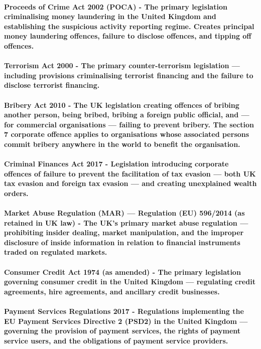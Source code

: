 \paragraph{\textbf{Proceeds of Crime Act 2002 (POCA)} - The primary legislation criminalising money laundering in the United Kingdom and establishing the suspicious activity reporting regime. Creates principal money laundering offences, failure to disclose offences, and tipping off offences.}
\paragraph{\textbf{Terrorism Act 2000} - The primary counter-terrorism legislation — including provisions criminalising terrorist financing and the failure to disclose terrorist financing.}
\paragraph{\textbf{Bribery Act 2010} - The UK legislation creating offences of bribing another person, being bribed, bribing a foreign public official, and — for commercial organisations — failing to prevent bribery. The section 7 corporate offence applies to organisations whose associated persons commit bribery anywhere in the world to benefit the organisation.}
\paragraph{\textbf{Criminal Finances Act 2017} - Legislation introducing corporate offences of failure to prevent the facilitation of tax evasion — both UK tax evasion and foreign tax evasion — and creating unexplained wealth orders.}
\paragraph{\textbf{Market Abuse Regulation (MAR) — Regulation (EU) 596/2014 (as retained in UK law)} - The UK's primary market abuse regulation — prohibiting insider dealing, market manipulation, and the improper disclosure of inside information in relation to financial instruments traded on regulated markets.}
\paragraph{\textbf{Consumer Credit Act 1974 (as amended)} - The primary legislation governing consumer credit in the United Kingdom — regulating credit agreements, hire agreements, and ancillary credit businesses.}
\paragraph{\textbf{Payment Services Regulations 2017} - Regulations implementing the EU Payment Services Directive 2 (PSD2) in the United Kingdom — governing the provision of payment services, the rights of payment service users, and the obligations of payment service providers.}
